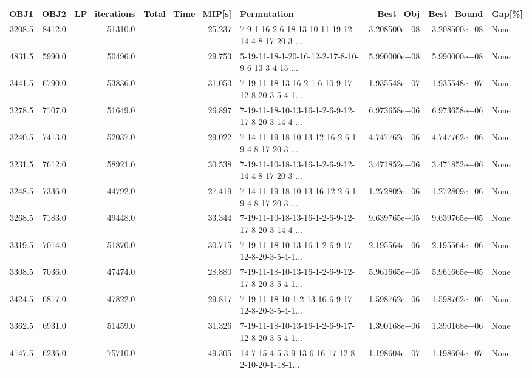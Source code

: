 \begin{tabular}{rrrrlrrl}
\toprule
   OBJ1 &    OBJ2 &  LP\_iterations &  Total\_Time\_MIP[s] &                                        Permutation &      Best\_Obj &    Best\_Bound & Gap[\%] \\
\midrule
 3208.5 &  8412.0 &        51310.0 &             25.237 &  7-9-1-16-2-6-18-13-10-11-19-12-14-4-8-17-20-3-... &  3.208500e+08 &  3.208500e+08 &   None \\
 4831.5 &  5990.0 &        50496.0 &             29.753 &  5-19-11-18-1-20-16-12-2-17-8-10-9-6-13-3-4-15-... &  5.990000e+08 &  5.990000e+08 &   None \\
 3441.5 &  6790.0 &        53836.0 &             31.053 &  7-19-11-18-13-16-2-1-6-10-9-17-12-8-20-3-5-4-1... &  1.935548e+07 &  1.935548e+07 &   None \\
 3278.5 &  7107.0 &        51649.0 &             26.897 &  7-19-11-18-10-13-16-1-2-6-9-12-17-8-20-3-14-4-... &  6.973658e+06 &  6.973658e+06 &   None \\
 3240.5 &  7413.0 &        52037.0 &             29.022 &  7-14-11-19-18-10-13-12-16-2-6-1-9-4-8-17-20-3-... &  4.747762e+06 &  4.747762e+06 &   None \\
 3231.5 &  7612.0 &        58921.0 &             30.538 &  7-19-11-10-18-13-16-1-2-6-9-12-14-4-8-17-20-3-... &  3.471852e+06 &  3.471852e+06 &   None \\
 3248.5 &  7336.0 &        44792.0 &             27.419 &  7-14-11-19-18-10-13-16-12-2-6-1-9-4-8-17-20-3-... &  1.272809e+06 &  1.272809e+06 &   None \\
 3268.5 &  7183.0 &        49448.0 &             33.344 &  7-19-11-10-18-13-16-1-2-6-9-12-17-8-20-3-14-4-... &  9.639765e+05 &  9.639765e+05 &   None \\
 3319.5 &  7014.0 &        51870.0 &             30.715 &  7-19-11-18-10-13-16-1-2-6-9-17-12-8-20-3-5-4-1... &  2.195564e+06 &  2.195564e+06 &   None \\
 3308.5 &  7036.0 &        47474.0 &             28.880 &  7-19-11-18-10-13-16-1-2-6-9-12-17-8-20-3-5-4-1... &  5.961665e+05 &  5.961665e+05 &   None \\
 3424.5 &  6817.0 &        47822.0 &             29.817 &  7-19-11-18-10-1-2-13-16-6-9-17-12-8-20-3-5-4-1... &  1.598762e+06 &  1.598762e+06 &   None \\
 3362.5 &  6931.0 &        51459.0 &             31.326 &  7-19-11-18-10-13-16-1-2-6-9-17-12-8-20-3-5-4-1... &  1.390168e+06 &  1.390168e+06 &   None \\
 4147.5 &  6236.0 &        75710.0 &             49.305 &  14-7-15-4-5-3-9-13-6-16-17-12-8-2-10-20-1-18-1... &  1.198604e+07 &  1.198604e+07 &   None \\

\end{tabular}
